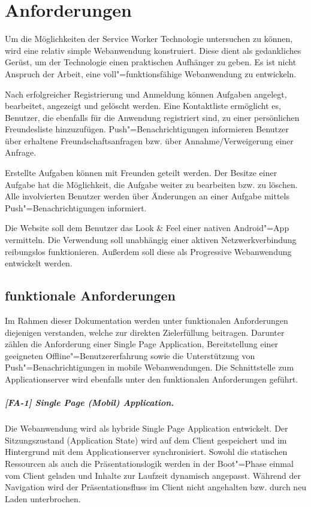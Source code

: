 \chapter{Anforderungen}
\label{chp_anforderungen}

Um die Möglichkeiten der Service Worker Technologie untersuchen zu können, wird eine relativ simple Webanwendung konstruiert. Diese dient als gedankliches Gerüst, um der Technologie einen praktischen Aufhänger zu geben. Es ist nicht Anspruch der Arbeit, eine voll"=funktionsfähige Webanwendung zu entwickeln.

Nach erfolgreicher Registrierung und Anmeldung können Aufgaben angelegt, bearbeitet, angezeigt und gelöscht werden. Eine Kontaktliste ermöglicht es, Benutzer, die ebenfalls für die Anwendung registriert sind, zu einer persönlichen Freundesliste hinzuzufügen. Push"=Benachrichtigungen informieren Benutzer über erhaltene Freundschaftsanfragen bzw. über Annahme/Verweigerung einer Anfrage. 

Erstellte Aufgaben können mit Freunden geteilt werden. Der Besitze einer Aufgabe hat die Möglichkeit, die Aufgabe weiter zu bearbeiten bzw. zu löschen. Alle involvierten Benutzer werden über Änderungen an einer Aufgabe mittels Push"=Benachrichtigungen informiert. 

Die Website soll dem Benutzer das Look \& Feel einer nativen Android"=App vermitteln. Die Verwendung soll unabhängig einer aktiven Netzwerkverbindung reibungslos funktionieren. Außerdem soll diese als \glqq Progressive Webanwendung\grqq{} entwickelt werden. 

\section{funktionale Anforderungen}
\label{sec_anforderungen_funktionale-anforderungen}

Im Rahmen dieser Dokumentation werden unter funktionalen Anforderungen diejenigen verstanden, welche zur direkten Zielerfüllung beitragen. Darunter zählen die Anforderung einer \glqq Single Page Application\grqq , Bereitstellung einer geeigneten Offline"=Benutzererfahrung sowie die Unterstützung von Push"=Benachrichtigungen in mobile Webanwendungen. Die Schnittstelle zum Applicationserver wird ebenfalls unter den funktionalen Anforderungen geführt.

\paragraph{[FA-1] Single Page (Mobil) Application.} Die Webanwendung wird als hybride Single Page Application entwickelt. Der Sitzungszustand (\glqq Application State\grqq) wird auf dem Client gespeichert und im Hintergrund mit dem Applicationserver synchronisiert. Sowohl die statischen Ressourcen als auch die Präsentationslogik werden in der \glqq Boot"=Phase\grqq{} einmal vom Client geladen und Inhalte zur Laufzeit dynamisch angepasst. Während der Navigation wird der Präsentationsfluss im Client nicht angehalten bzw. durch \glqq neu Laden\grqq{} unterbrochen.

